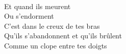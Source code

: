 \\
Et quand ils meurent\\
Ou s'endorment\\
C'est dans le creux de tes bras\\
Qu'ils s'abandonnent et qu'ils brûlent\\
Comme un clope entre tes doigts\\
